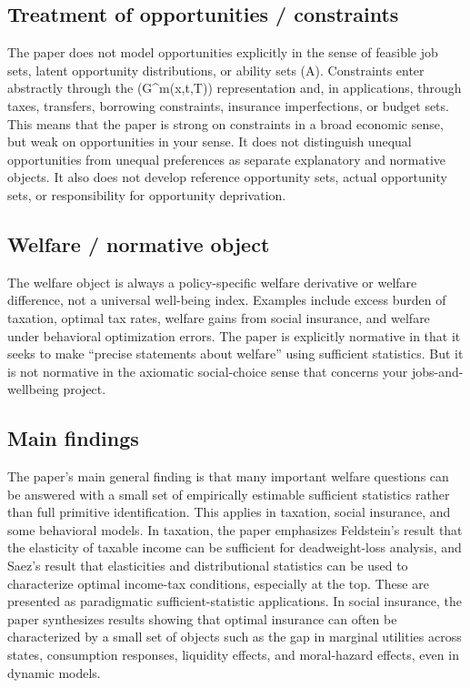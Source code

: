 \documentclass[11pt,a4paper]{article}
\begin{document}
\subsection*{Treatment of opportunities / constraints}
The paper does not model opportunities explicitly in the sense of feasible job sets, latent opportunity distributions, or ability sets (A). Constraints enter abstractly through the (G\textasciicircum{}m(x,t,T)) representation and, in applications, through taxes, transfers, borrowing constraints, insurance imperfections, or budget sets. This means that the paper is strong on constraints in a broad economic sense, but weak on opportunities in your sense. It does not distinguish unequal opportunities from unequal preferences as separate explanatory and normative objects. It also does not develop reference opportunity sets, actual opportunity sets, or responsibility for opportunity deprivation.

\subsection*{Welfare / normative object}
The welfare object is always a policy-specific welfare derivative or welfare difference, not a universal well-being index. Examples include excess burden of taxation, optimal tax rates, welfare gains from social insurance, and welfare under behavioral optimization errors. The paper is explicitly normative in that it seeks to make “precise statements about welfare” using sufficient statistics. But it is not normative in the axiomatic social-choice sense that concerns your jobs-and-wellbeing project.

\subsection*{Main findings}
The paper’s main general finding is that many important welfare questions can be answered with a small set of empirically estimable sufficient statistics rather than full primitive identification. This applies in taxation, social insurance, and some behavioral models. In taxation, the paper emphasizes Feldstein’s result that the elasticity of taxable income can be sufficient for deadweight-loss analysis, and Saez’s result that elasticities and distributional statistics can be used to characterize optimal income-tax conditions, especially at the top. These are presented as paradigmatic sufficient-statistic applications. In social insurance, the paper synthesizes results showing that optimal insurance can often be characterized by a small set of objects such as the gap in marginal utilities across states, consumption responses, liquidity effects, and moral-hazard effects, even in dynamic models.
\end{document}
